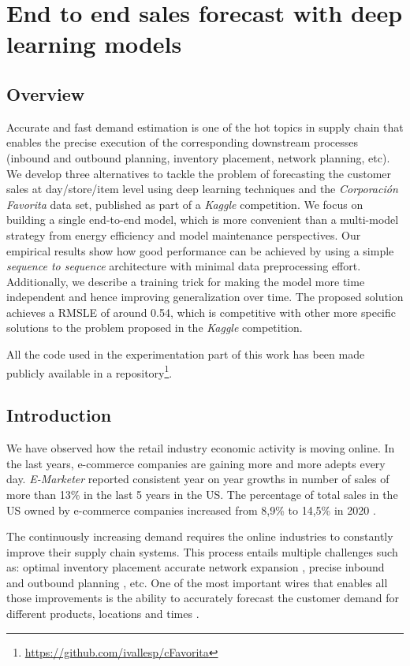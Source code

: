 \chapter{End to end sales forecast with deep learning models} \label{ch:salesforecast}

\section{Overview}
Accurate and fast demand estimation is one of the hot topics in supply chain that enables the precise execution of the corresponding downstream processes (inbound and outbound planning, inventory placement, network planning, etc). We develop three alternatives to tackle the problem of forecasting the customer sales at day/store/item level using deep learning techniques and the \textit{Corporación Favorita} data set, published as part of a \textit{Kaggle} competition. We focus on building a single end-to-end model, which is more convenient than a multi-model strategy from  energy efficiency and  model maintenance perspectives. Our empirical results show how good performance can be achieved by using a simple \textit{sequence to sequence} architecture with minimal data preprocessing effort. Additionally, we describe a training trick for making the model more time independent and hence improving generalization over time. The proposed solution achieves a RMSLE of around 0.54, which is competitive with other more specific solutions to the problem proposed in the \textit{Kaggle} competition.

All the code used in the experimentation part of this work has been made publicly available in a repository\footnote{\url{https://github.com/ivallesp/cFavorita}}.


\section{Introduction}
We have observed how the retail industry economic activity is moving online. In the last years, e-commerce companies are gaining more and more adepts every day. \textit{E-Marketer} \autocite{emarketer2019, emarketer2020} reported consistent year on year growths in number of sales of more than 13\% in the last 5 years in the US. The percentage of total sales in the US owned by e-commerce companies increased from 8,9\% to 14,5\% in 2020 \autocite{emarketer2019, emarketer2020}.

The continuously increasing demand requires the online industries to constantly improve their supply chain systems. This process entails multiple challenges such as: optimal inventory placement \autocite{graves2008}accurate network expansion \autocite{hossein2017}, precise inbound and outbound planning \autocite{kaipia2009}, etc. One of the most important wires that enables all those improvements is the ability to accurately forecast the customer demand for different products, locations and times \autocite{forslund2007}.


